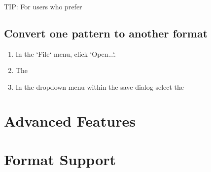 \documentclass{report}
\begin{document}
TIP: For users who prefer

\subsection{Convert one pattern to another format}

\begin{enumerate}
\item In the `File` menu, click `Open...`.
\item The 
\item In the dropdown menu within the save dialog select the 
\end{enumerate}

\section{Advanced Features}


\section{Format Support}
\end{document}
